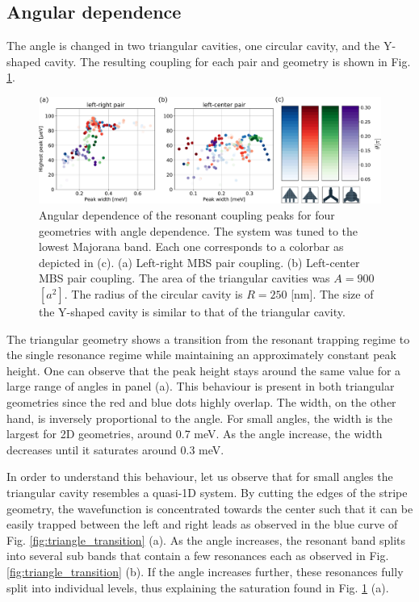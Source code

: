 \subsection{Angular dependence}

The angle is changed in two triangular cavities, one circular cavity, and the Y-shaped cavity.
The resulting coupling for each pair and geometry is shown in Fig. \ref{fig:angles_couplings}.

\begin{figure}[h!]
\centering
  \includegraphics[width=\linewidth]{figures/couplings_angles.pdf}
  \caption{Angular dependence of the resonant coupling peaks for four geometries with angle dependence. The system was tuned to the lowest Majorana band.  Each one corresponds to a colorbar as depicted in (c). (a) Left-right MBS pair coupling. (b) Left-center MBS pair coupling. The area of the triangular cavities was $A=900$ $[a^2]$. The radius of the circular cavity is $R=250$ [nm]. The size of the Y-shaped cavity is similar to that of the triangular cavity.}
  \label{fig:angles_couplings}
\end{figure}

The triangular geometry shows a transition from the resonant trapping regime to the single resonance regime while maintaining an approximately constant peak height.
One can observe that the peak height stays around the same value for a large range of angles in panel (a).
This behaviour is present in both triangular geometries since the red and blue dots highly overlap.
The width, on the other hand, is inversely proportional to the angle.
For small angles, the width is the largest for 2D geometries, around $0.7$ meV.
As the angle increase, the width decreases until it saturates around $0.3$ meV.

In order to understand this behaviour, let us observe that for small angles the triangular cavity resembles a quasi-1D system.
By cutting the edges of the stripe geometry, the wavefunction is concentrated towards the center such that it can be easily trapped between the left and right leads as observed in the blue curve of Fig. \ref{fig:triangle_transition} (a).
As the angle increases, the resonant band splits into several sub bands that contain a few resonances each as observed in Fig. \ref{fig:triangle_transition} (b).
If the angle increases further, these resonances fully split into individual levels, thus explaining the saturation found in Fig. \ref{fig:angles_couplings} (a).

